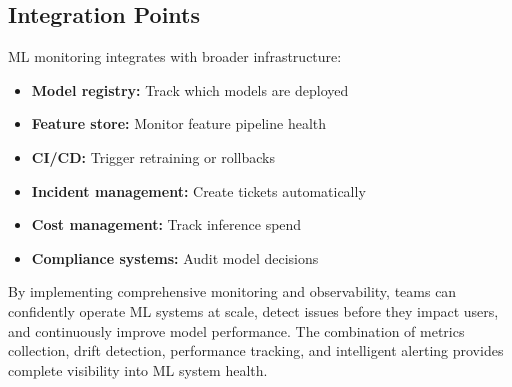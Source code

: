 \subsection{Integration Points}

ML monitoring integrates with broader infrastructure:

\begin{itemize}
    \item \textbf{Model registry:} Track which models are deployed
    \item \textbf{Feature store:} Monitor feature pipeline health
    \item \textbf{CI/CD:} Trigger retraining or rollbacks
    \item \textbf{Incident management:} Create tickets automatically
    \item \textbf{Cost management:} Track inference spend
    \item \textbf{Compliance systems:} Audit model decisions
\end{itemize}

By implementing comprehensive monitoring and observability, teams can confidently operate ML systems at scale, detect issues before they impact users, and continuously improve model performance. The combination of metrics collection, drift detection, performance tracking, and intelligent alerting provides complete visibility into ML system health.
